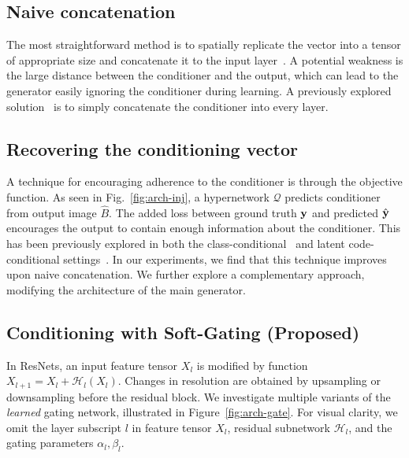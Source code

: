 
\subsection{Naive concatenation}
The most straightforward method is to spatially replicate the vector into a tensor of appropriate size and concatenate it to the input layer~\cite{zhu2017toward,choi2017stargan}. A potential weakness
is the large distance between the conditioner and the output, which can lead to the generator easily ignoring the conditioner during learning. A previously explored solution~\cite{zhu2017toward} is to simply concatenate the conditioner into every layer.

\subsection{Recovering the conditioning vector}

A technique for encouraging adherence to the conditioner is through the objective function. As seen in Fig.~\ref{fig:arch-inj}, a hypernetwork $\mathcal{Q}$ predicts conditioner from output image $\widehat{B}$. 
The added loss between ground truth ${\bf y}$ and predicted $\hat{ {\bf y}}$ encourages the output to contain enough information about the conditioner. This has been previously explored in both the class-conditional~\cite{odena2016conditional,choi2017stargan,salimans2016improved} and latent code-conditional settings~\cite{chen2016infogan,donahue2016adversarial,zhu2017toward}. In our experiments, we find that this technique improves upon naive concatenation. We further explore a complementary approach, modifying the architecture of the main generator.


\subsection{Conditioning with Soft-Gating (Proposed)}
In ResNets, an input feature tensor $X_l$ is modified by function $X_{l+1} = X_l+\mathcal{H}_l(X_l)$.
Changes in resolution are obtained by upsampling or downsampling before the residual block.
We investigate multiple variants of the \textit{learned} gating network, illustrated in Figure~\ref{fig:arch-gate}.
For visual clarity, we omit the layer subscript $l$ in feature tensor $X_l$, residual subnetwork $\mathcal{H}_l$, and the gating parameters $\alpha_l, \beta_l$.

